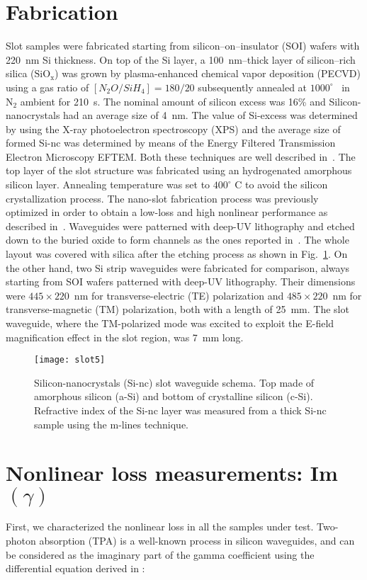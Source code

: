 \section{Fabrication}
Slot samples were fabricated starting from silicon--on--insulator (SOI) wafers with 220~nm Si thickness.
On top of the Si layer, a 100~nm--thick layer of silicon--rich silica ($ \mathrm{SiO_x} $) was grown by plasma-enhanced chemical vapor deposition (PECVD) using a gas ratio of $[N_2O/SiH_4]=180/20$ subsequently annealed at $1000^\circ$ ~in $ \mathrm{N}_2 $ ambient for 210~s.
The nominal amount of silicon excess was 16\% and Silicon-nanocrystals had an average size of 4~nm.
The value of Si-excess was determined by using the X-ray photoelectron spectroscopy (XPS) and the average size of formed Si-nc was determined by means of the Energy Filtered Transmission Electron Microscopy EFTEM. Both these techniques are well described in~\cite{Garcia2004}.
The top layer of the slot structure was fabricated using an hydrogenated amorphous silicon layer.
Annealing temperature was set to $400^\circ$ C to avoid the silicon crystallization process.
The nano-slot fabrication process was previously optimized in order to obtain a low-loss and high nonlinear performance as described in~\cite{Jordana2007}.
Waveguides were patterned with deep-UV lithography and etched down to the buried oxide to form channels as the ones reported in~\cite{Martinez2010a, Trita2011}.
The whole layout was covered with silica after the etching process as shown in Fig.~\ref{fig:semSlot}.
On the other hand, two Si strip waveguides were fabricated for comparison, always starting  from SOI wafers patterned with deep-UV lithography.
Their dimensions were $445\times220$~nm for transverse-electric (TE) polarization and $485\times220$~nm for transverse-magnetic (TM) polarization, both with a length of 25~mm.
The slot waveguide, where the TM-polarized mode was excited to exploit the E-field magnification effect in the slot region, was 7~mm long.


\begin{figure}[htb]
\centering
\texttt{[image: slot5]}%
\caption{Silicon-nanocrystals (Si-nc) slot waveguide schema. Top made of amorphous silicon (a-Si) and bottom of crystalline silicon (c-Si).
Refractive index of the Si-nc layer was measured from a thick Si-nc sample using the m-lines technique.}
\label{fig:semSlot}
\end{figure}


\section{Nonlinear loss measurements: Im$ (\gamma) $}
\label{sec:imGammaTimeRes}
First, we characterized the nonlinear loss in all the samples under test.
Two-photon absorption (TPA) is a well-known process in silicon waveguides, and can be considered as the imaginary part of the gamma coefficient using the differential equation derived in \cite{Mizrahi}:

